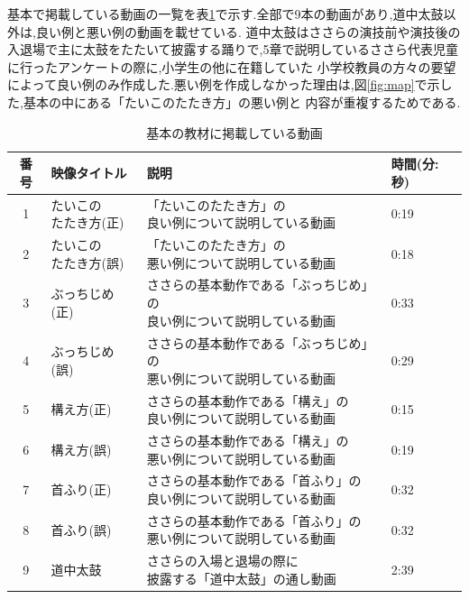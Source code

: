 \documentclass[12pt]{ltjsarticle}
\begin{document}
基本で掲載している動画の一覧を表\ref{table:hkihon}で示す.全部で9本の動画があり,道中太鼓以外は,良い例と悪い例の動画を載せている.
道中太鼓はささらの演技前や演技後の入退場で主に太鼓をたたいて披露する踊りで,5章で説明しているささら代表児童に行ったアンケートの際に,小学生の他に在籍していた
小学校教員の方々の要望によって良い例のみ作成した.悪い例を作成しなかった理由は,図\ref{fig:map}で示した,基本の中にある「たいこのたたき方」の悪い例と
内容が重複するためである.
\begin{table}[h]
  \caption{基本の教材に掲載している動画}
  \label{table:hkihon}
  \centering
  {\renewcommand\arraystretch{2.0}
   \begin{tabular}{clll}
    \hline
    番号 & 映像タイトル & 説明 & 時間(分:秒) \\
  
    \hline \hline
    1 &  \shortstack{たいこの\\たたき方(正)} &  \shortstack{「たいこのたたき方」の\\良い例について説明している動画} & 0:19 \\
    2 &  \shortstack{たいこの\\たたき方(誤)} &  \shortstack{「たいこのたたき方」の\\悪い例について説明している動画} & 0:18 \\
    3 &  ぶっちじめ(正) &  \shortstack{ささらの基本動作である「ぶっちじめ」の\\良い例について説明している動画} & 0:33 \\
    4 & ぶっちじめ(誤) &  \shortstack{ささらの基本動作である「ぶっちじめ」の\\悪い例について説明している動画} & 0:29 \\
    5 & 構え方(正)  &  \shortstack{ささらの基本動作である「構え」の\\良い例について説明している動画} & 0:15\\
    6 & 構え方(誤) &  \shortstack{ささらの基本動作である「構え」の\\悪い例について説明している動画} & 0:19\\
    7 & 首ふり(正)  &  \shortstack{ささらの基本動作である「首ふり」の\\良い例について説明している動画} & 0:32 \\
    8 & 首ふり(誤) &  \shortstack{ささらの基本動作である「首ふり」の\\悪い例について説明している動画} & 0:32 \\
    9 & 道中太鼓 &  \shortstack{ささらの入場と退場の際に\\披露する「道中太鼓」の通し動画}& 2:39 \\

   
    \hline
   \end{tabular}
  }
 \end{table}
\end{document}
